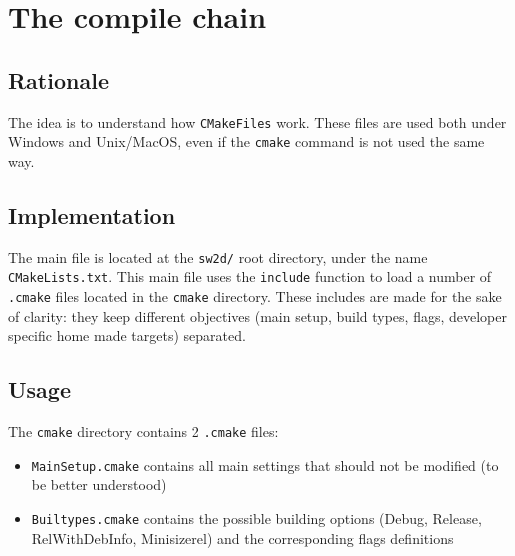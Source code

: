 \section{The compile chain}
\subsection{Rationale}
The idea is to understand how \texttt{CMakeFiles} work. 
These files are used both under Windows and Unix/MacOS, 
even if the \texttt{cmake} command is not used the same way.
\subsection{Implementation}
The main file is located at the \texttt{sw2d/} root directory, under the name \texttt{CMakeLists.txt}. 
This main file uses the \texttt{include} function to load a number of \texttt{.cmake} files located in the \texttt{cmake} directory. 
These includes are made for the sake of clarity: they keep different objectives (main setup, 
build types, flags, developer specific home made targets) separated.

\subsection{Usage}
The \texttt{cmake} directory contains 2 \texttt{.cmake} files:
\begin{itemize}
    \item \texttt{MainSetup.cmake} contains all main settings that should not be modified (to be better understood)
    \item \texttt{Builtypes.cmake} contains the possible building options (Debug, Release, RelWithDebInfo, Minisizerel) and the corresponding flags definitions
\end{itemize}
